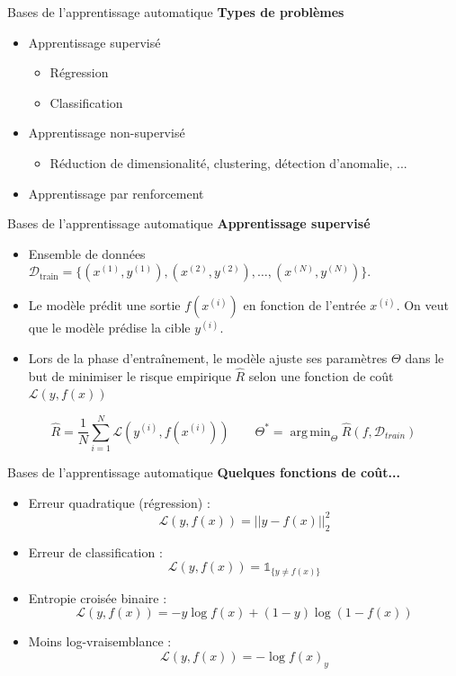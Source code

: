 \documentclass[french]{beamer}
\DeclareMathOperator*{\argmin}{arg\,min}
\begin{document}
\begin{frame}{Bases de l'apprentissage automatique}
\textbf{Types de problèmes}
\vspace{0.5cm}

\begin{itemize}
	\item Apprentissage supervisé
	\begin{itemize}
		\item Régression
		\item Classification
	\end{itemize}
	\item Apprentissage non-supervisé
	\begin{itemize}
		\item Réduction de dimensionalité, clustering, détection d'anomalie, ...
	\end{itemize}
	\item Apprentissage par renforcement
\end{itemize}
\end{frame}

\begin{frame}{Bases de l'apprentissage automatique}
\textbf{Apprentissage supervisé}
\vspace{0.5cm}
\begin{itemize}
	\item Ensemble de données $\mathcal{D_{\mathrm{train}}} = \{(x^{(1)}, y^{(1)}), (x^{(2)}, y^{(2)}), \dots,  (x^{(N)}, y^{(N)})\}$.
	\item Le modèle prédit une sortie $f(x^{(i)})$ en fonction de l'entrée $x^{(i)}$. On veut que le modèle prédise la cible $y^{(i)}$.
	\item Lors de la phase d'entraînement, le modèle ajuste ses paramètres $\Theta$ dans le but de minimiser le risque empirique $\hat{R}$ selon une fonction de coût $\mathcal{L}(y, f(x))$
\end{itemize}
$$
\hat{R} = \frac{1}{N} \sum_{i=1}^N \mathcal{L}\left(y^{(i)}, f(x^{(i)})\right)
\qquad
\Theta^* = \argmin_\Theta \hat{R}(f, \mathcal{D}_{train})
$$
\end{frame}

\begin{frame}{Bases de l'apprentissage automatique}
\textbf{Quelques fonctions de coût...}
\vspace{.5cm}
\begin{itemize}
	\item Erreur quadratique (régression) : 
	\vspace{-.2cm}
	$$ \mathcal{L}(y, f(x)) = ||y-f(x)||_2^2$$
	\item Erreur de classification : 
	\vspace{-.2cm}
	$$\mathcal{L}(y, f(x)) = \mathbb{1}_{\{y \neq f(x) \}}$$
	\item Entropie croisée binaire : 
	\vspace{-.2cm}	
	$$ \mathcal{L}(y, f(x)) = -y \log f(x) + (1-y) \log (1-f(x))$$
	\item Moins log-vraisemblance : 
	\vspace{-.2cm}	
	$$ \mathcal{L}(y, f(x)) = - \log f(x)_y $$
\end{itemize}
\end{frame}
\end{document}
